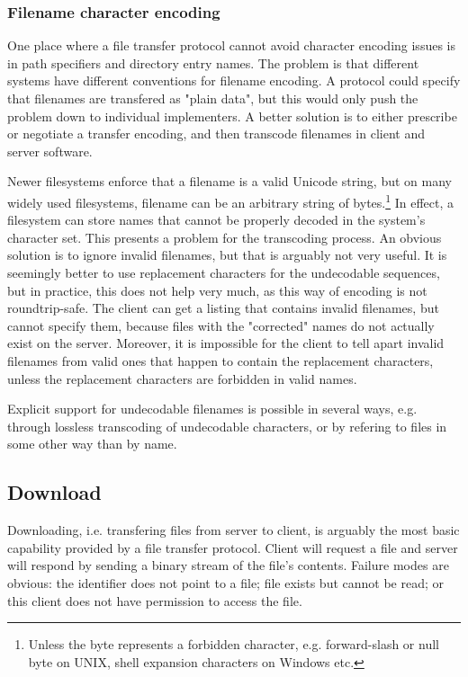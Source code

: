 \subsubsection{Filename character encoding}

One place where a file transfer protocol cannot avoid character encoding issues is in path specifiers and
directory entry names. The problem is that different systems have different conventions for filename encoding.
A protocol could specify that filenames are transfered as "plain data", but this would only push the problem
down to individual implementers. A better solution is to either prescribe or negotiate a transfer encoding,
and then transcode filenames in client and server software.

Newer filesystems enforce that a filename is a valid Unicode string, but on many widely used filesystems,
filename can be an arbitrary string of bytes.\footnote{Unless the byte represents a forbidden character, e.g.
forward-slash or null byte on UNIX, shell expansion characters on Windows etc.} In effect, a filesystem can
store names that cannot be properly decoded in the system's character set. This presents a problem for the
transcoding process.  An obvious solution is to ignore invalid filenames, but that is arguably not very
useful. It is seemingly better to use replacement characters for the undecodable sequences, but in practice,
this does not help very much, as this way of encoding is not roundtrip-safe. The client can get a listing that
contains invalid filenames, but cannot specify them, because files with the "corrected" names do not actually
exist on the server. Moreover, it is impossible for the client to tell apart invalid filenames from valid ones
that happen to contain the replacement characters, unless the replacement characters are forbidden in valid
names.

Explicit support for undecodable filenames is possible in several ways, e.g. through lossless transcoding of
undecodable characters, or by refering to files in some other way than by name.


\subsection{Download}

Downloading, i.e. transfering files from server to client, is arguably the most basic capability provided by
a file transfer protocol. Client will request a file and server will respond by sending a binary stream of the
file's contents. Failure modes are obvious: the identifier does not point to a file; file exists but cannot be
read; or this client does not have permission to access the file.

